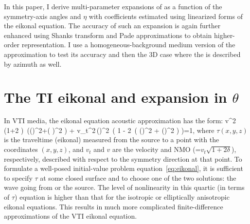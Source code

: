 In this paper, I derive multi-parameter expansions of  
as a function of the symmetry-axis  angles and $\eta$ with coefficients estimated using
linearized forms of the eikonal equation. The accuracy of such an expansion is again further enhanced using Shanks transform and Pade
approximations to obtain  higher-order representation. I use a homogeneous-background medium version of the approximation to test its
accuracy and then   the 3D case where the   is described by
azimuth as well.

\section{The TI eikonal and expansion in $\theta$}

In VTI media, the eikonal equation \cite[]{GEO63-02-06230631}
   acoustic  approximation has the form:
\beqa
{v^2} (1+2 \eta) \,{\left(\left(\right)^2+\left(
\right)^2 \right)} + 
    {{{v_t}}^2}\,{\left(\right)^2}\,
     \left( 1 - 2  \,{\left( \left(\right)^2 +
\left(\right)^2 \right)} \right)=1,
\label{eq:eikonal}
\eeqa
where $\tau (x,y,z)$ is the traveltime (eikonal) measured from the source to
a point with the coordinates $(x, y, z)$, and $v_{t}$ and $v$  are the
velocity and NMO  (=$v_{t} \sqrt{1+2 \delta}$), respectively,  
described with respect to the symmetry direction at
that point.  To formulate
a well-posed initial-value problem   equation~\ref{eq:eikonal}, it is
sufficient to specify $\tau$ at some closed surface and to choose one
of the two solutions: the wave going from or   the
source.
The level of nonlinearity in this quartic  (in terms of $\tau$) equation is higher than that for the
isotropic or elliptically anisotropic eikonal equations. This results in much more complicated 
finite-difference  approximations of the VTI eikonal equation.

